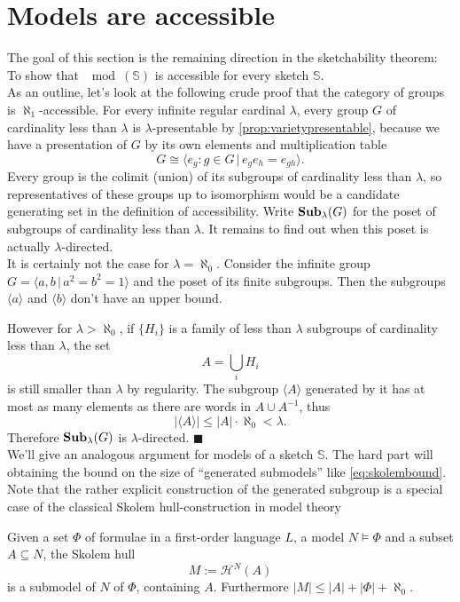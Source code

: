 \section{Models are accessible}
\label{sec:sketchesaccessible}


The goal of this section is the remaining direction in the sketchability theorem: To show that $\mod(\mathbb S)$ is accessible for every sketch $\mathbb S$. \\

As an outline, let's look at the following crude proof that the category of groups is $\aleph_1$-accessible. For every infinite regular cardinal $\lambda$, every group $G$ of cardinality less than $\lambda$ is $\lambda$-presentable by \ref{prop:varietypresentable}, because we have a presentation of $G$ by its own elements and multiplication table
\[ G \cong \langle e_g : g \in G \,|\, e_g e_h = e_{gh} \rangle. \]
Every group is the colimit (union) of its subgroups of cardinality less than $\lambda$, so representatives of these groups up to isomorphism would be a candidate generating set in the definition of accessibility. Write $\mathbf{Sub}_\lambda(G)$ for the poset of subgroups of cardinality less than $\lambda$. It remains to find out when this poset is actually $\lambda$-directed. \\

It is certainly not the case for $\lambda=\aleph_0$. Consider the infinite group $G=\langle a, b \,|\, a^2 = b^2 = 1 \rangle$ and the poset of its finite subgroups. Then the subgroups $\langle a \rangle$ and $\langle b \rangle$ don't have an upper bound.

However for $\lambda > \aleph_0$, if $\{H_i\}$ is a family of less than $\lambda$ subgroups of cardinality less than $\lambda$, the set \[ A = \bigcup_i H_i \]
is still smaller than $\lambda$ by regularity. The subgroup $\langle A \rangle$ generated by it has at most as many elements as there are words in $A \cup A^{-1}$, thus
\begin{equation} |\langle A \rangle| \leq |A|\cdot \aleph_0 < \lambda. \label{eq:skolembound} \end{equation}
Therefore $\mathbf{Sub}_\lambda(G)$ is $\lambda$-directed. $\blacksquare$ \\

We'll give an analogous argument for models of a sketch $\mathbb S$. The hard part will obtaining the bound on the size of ``generated submodels'' like \eqref{eq:skolembound}. Note that the rather explicit construction of the generated subgroup is a special case of the classical Skolem hull-construction in model theory
\begin{Theorem}
Given a set $\Phi$ of formulae in a first-order language $L$, a model $N \models \Phi$ and a subset $A \subseteq N$, the Skolem hull
\[ M := \mathcal H^N(A) \]
is a submodel of $N$ of $\Phi$, containing $A$. Furthermore $|M| \leq |A| + |\Phi| + \aleph_0$. 
\end{Theorem}

